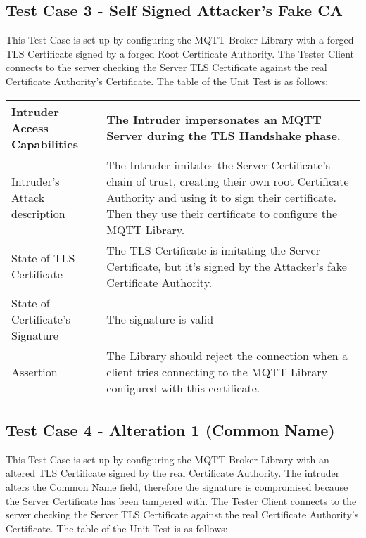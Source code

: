 \documentclass[binding=0.6cm,noexaminfo]{sapthesis}
\begin{document}
\subsection{Test Case 3 - Self Signed Attacker's Fake CA}
This Test Case is set up by configuring the MQTT Broker Library with a forged TLS Certificate signed by a forged Root Certificate Authority. The Tester Client connects to the server checking the Server TLS Certificate against the real Certificate Authority’s Certificate. The table of the Unit Test is as follows:

\begin{center}
\begin{tabular}{| p{6cm} | p{6cm} |}
\hline
Intruder Access Capabilities & The Intruder impersonates an MQTT Server during the TLS Handshake phase. \\
\hline
Intruder’s Attack description & The Intruder imitates the Server Certificate’s chain of trust, creating their own root Certificate Authority and using it to sign their certificate. Then they use their certificate to configure the MQTT Library. \\
\hline
State of TLS Certificate & The TLS Certificate is imitating the Server Certificate, but it’s signed by the Attacker’s fake Certificate Authority. \\
\hline
State of Certificate’s Signature & The signature is valid \\
\hline
Assertion & The Library should reject the connection when a client tries connecting to the MQTT Library configured with this certificate. \\
\hline
\end{tabular}
\end{center}

\subsection{Test Case 4 - Alteration 1 (Common Name)}
This Test Case is set up by configuring the MQTT Broker Library with an altered TLS Certificate signed by the real Certificate Authority. The intruder alters the Common Name field, therefore the signature is compromised because the Server Certificate has been tampered with. The Tester Client connects to the server checking the Server TLS Certificate against the real Certificate Authority’s Certificate. The table of the Unit Test is as follows:
\end{document}
